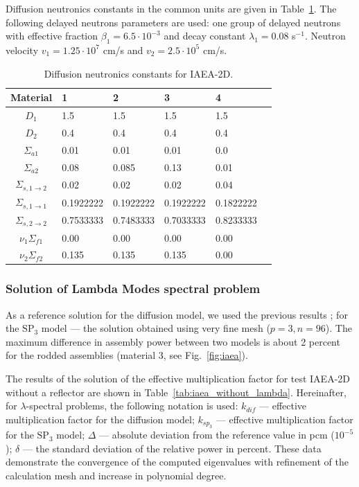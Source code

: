 \documentclass[authoryear]{elsarticle}
\begin{document}
Diffusion neutronics constants in the common units are given in Table~\ref{tab:iaea}.
The following delayed neutrons parameters are used: one group of delayed neutrons with effective fraction $\beta_1 = 6.5\cdot10^{-3}$ and decay constant $\lambda_1 = 0.08$ s$^{-1}$. 
Neutron velocity  $v_1 = 1.25 \cdot 10^7$ cm/s and $v_2 = 2.5 \cdot 10^5$ cm/s.

\begin{table}[h]
\caption{Diffusion neutronics constants for IAEA-2D.}
\label{tab:iaea}
\begin{center}
\begin{tabular}{c l l l l l}
\hline
Material & 1 & 2 & 3 & 4\\
\hline 
$D_1$ & 1.5 & 1.5 & 1.5 & 1.5\\
$D_2$ & 0.4 & 0.4 & 0.4 & 0.4\\
$\Sigma_{a1}$ & 0.01 & 0.01 & 0.01 & 0.0\\
$\Sigma_{a2}$ & 0.08 & 0.085 & 0.13 & 0.01\\
$\Sigma_{s,1\rightarrow2}$ & 0.02 & 0.02 & 0.02 & 0.04\\
$\Sigma_{s,1\rightarrow1}$ & 0.1922222 & 0.1922222 & 0.1922222 & 0.1822222\\
$\Sigma_{s,2\rightarrow2}$ & 0.7533333 & 0.7483333 & 0.7033333 & 0.8233333\\
$\nu_1\Sigma_{f1}$ & 0.00 & 0.00 & 0.00 & 0.00\\
$\nu_2\Sigma_{f2}$ & 0.135 & 0.135 & 0.135 & 0.00\\
\hline
\end{tabular}
\end{center}
\end{table}

\subsubsection{Solution of Lambda Modes spectral problem}
As a reference solution for the diffusion model, we used the previous results \citep{avvakumov2014}; for the $\mathrm{SP_3}$ model --- the solution obtained using very fine mesh ($p = 3, n = 96$). The maximum difference in assembly power between two models is about 2 percent for the rodded assemblies (material 3, see Fig.~\ref{fig:iaea}).

The results of the solution of the effective multiplication factor for test IAEA-2D without a reflector are shown in Table~\ref{tab:iaea_without_lambda}.
Hereinafter, for $\lambda$-spectral problems, the following notation is used: $k_{dif}$ --- effective multiplication factor for the diffusion model; $k_{sp_3}$ --- effective multiplication factor for the $\mathrm{SP_3}$ model; $\Delta$ --- absolute deviation from the reference value in pcm ($10^{-5}$); $\delta$ --- the standard deviation of the relative power in percent. %
These data demonstrate the convergence of the computed eigenvalues with refinement of the calculation mesh and increase in polynomial degree.
\end{document}
